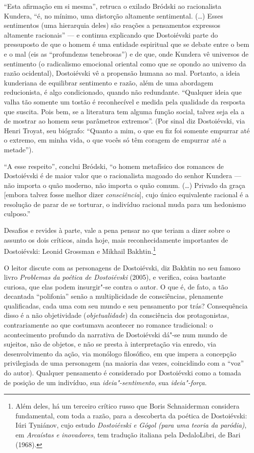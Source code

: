 ``Esta afirmação em si mesma'', retruca o exilado Bródski ao
racionalista Kundera, ``é, no mínimo, uma distorção altamente
sentimental. (\ldots{}) Esses sentimentos (uma hierarquia deles) são reações
a pensamentos expressos altamente racionais'' --- e continua explicando
que Dostoiévski parte do pressuposto de que o homem é uma entidade
espiritual que se debate entre o bem e o mal (eis as ``profundezas
tenebrosas'') e de que, onde Kundera vê universos de sentimento (o
radicalismo emocional oriental como que se opondo ao universo da razão
ocidental), Dostoiévski vê a propensão humana ao mal. Portanto, a ideia
kunderiana de equilibrar sentimento e razão, além de uma abordagem
reducionista, é algo condi­cionado, quando não redundante. ``Qualquer
ideia que valha tão somente um tostão é reconhecível e medida pela
qualidade da resposta que suscita. Pois bem, se a literatura tem alguma
função social, talvez seja ela a de mostrar ao homem seus parâmetros
extremos''. (Por sinal diz Dostoiévski, via Henri Troyat, seu biógrafo:
``Quanto a mim, o que eu fiz foi somente empurrar até o extremo, em
minha vida, o que vocês só têm coragem de empurrar até a metade'').

``A esse respeito'', conclui Bródski, ``o homem metafísico dos romances
de Dostoiévski é de maior valor que o racionalista magoado do senhor
Kundera --- não importa o quão moderno, não importa o quão comum. (\ldots{})
Privado da graça [embora talvez fosse melhor dizer
\emph{consciência}], cujo único equivalente racional é a resolução de
parar de se torturar, o indivíduo racional muda para um hedonismo
culposo.''

Desafios e revides à parte, vale a pena pensar no que teriam a dizer
sobre o assunto os dois críticos, ainda hoje, mais reconhecidamente
importantes de Dostoiévski: Leonid Grossman e Mikhail Bakhtin.\footnote{Além
  deles, há um terceiro crítico russo que Boris Schnaiderman considera
  fundamental, com toda a razão, para a descoberta da poética de
  Dostoiévski: Iúri Tyniánov, cujo estudo \emph{Dostoiévski e Gógol
  (para uma teoria da paródia)}, em \emph{Arcaístas e inovadores}, tem
  tradução italiana pela DedaloLibri, de Bari (1968).}

O leitor discute com as personagens de Dostoiévski, diz Bakhtin no seu
famoso livro \emph{Problemas da poética de Dostoiévski} (2005), e
verifica, coisa bastante curiosa, que elas podem insurgir"-se contra o
autor. O que é, de fato, a tão decantada ``polifonia'' senão a
multiplicidade de consciências, plena­mente qualificadas, cada uma com
seu mundo e seu pensamento por trás? Consequência disso é a não
objetividade (\emph{objetualidade}) da consciência dos protagonistas,
contrariamente ao que costumava acontecer no romance tradicional: o
acontecimento profundo da narrativa de Dostoiévski dá"-se num mundo de
sujeitos, não de objetos, e não se presta à interpre­tação via enredo,
via desenvolvimento da ação, via monólogo filosófico, em que impera a
concepção privilegiada de uma personagem (na maioria das vezes,
coincidindo com a ``voz'' do autor). Qualquer pensamento é considerado
por Dostoiévski como a tomada de posição de um indivíduo, sua
\emph{ideia"-sentimento}, sua \emph{ideia"-força}.

